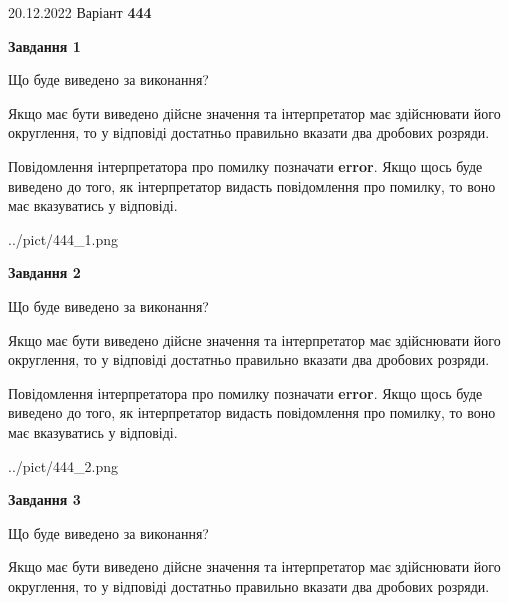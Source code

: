 \documentclass[12pt, ukrainian]{article}
\begin{document}
{20.12.2022 Варіант \No \textbf { 444 }\par}
{
\begin {Large}

{\begin {center}\textbf{Завдання 1}\end {center}}\par
Що буде виведено за виконання? \par

Якщо має бути виведено дійсне значення та інтерпретатор має здійснювати його округлення, 
то у відповіді достатньо правильно вказати два дробових розряди.

Повідомлення інтерпретатора про помилку позначати \textbf{error}.
Якщо щось буде виведено до того, як інтерпретатор видасть повідомлення про помилку, 
то воно має вказуватись у відповіді. \par

\begin{center}
	{../pict/444_1.png}
\end{center}
\newpage

{\begin {center}\textbf{Завдання 2}\end {center}}\par
Що буде виведено за виконання? \par

Якщо має бути виведено дійсне значення та інтерпретатор має здійснювати його округлення, 
то у відповіді достатньо правильно вказати два дробових розряди.

Повідомлення інтерпретатора про помилку позначати \textbf{error}.
Якщо щось буде виведено до того, як інтерпретатор видасть повідомлення про помилку, 
то воно має вказуватись у відповіді. \par

\begin{center}
	{../pict/444_2.png}
\end{center}
\newpage

{\begin {center}\textbf{Завдання 3}\end {center}}\par
Що буде виведено за виконання? \par

Якщо має бути виведено дійсне значення та інтерпретатор має здійснювати його округлення, 
то у відповіді достатньо правильно вказати два дробових розряди.


\end{Large}}
\end{document}
